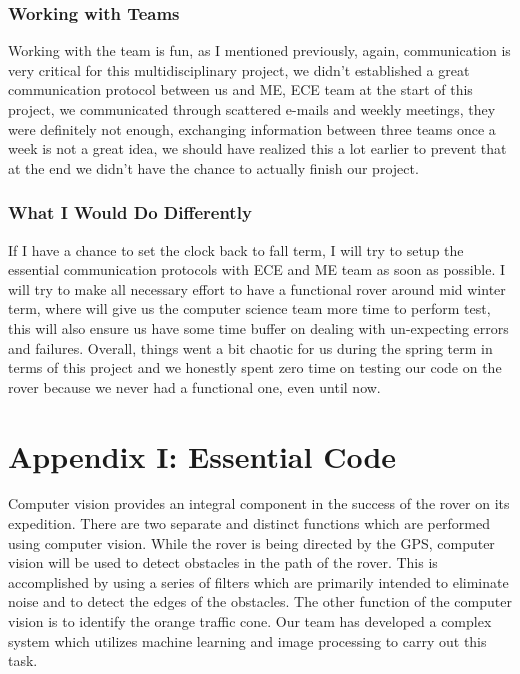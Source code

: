 \documentclass[10pt,letterpaper,onecolumn,draftclsnofoot,journal]{IEEEtran}
\begin{document}
\subsubsection{\textbf{Working with Teams}}
Working with the team is fun, as I mentioned previously, again, communication is very critical for this multidisciplinary project, we didn't established a great communication protocol between us and ME, ECE team at the start of this project, we communicated through scattered e-mails and weekly meetings, they were definitely not enough, exchanging information between three teams once a week is not a great idea, we should have realized this a lot earlier to prevent that at the end we didn't have the chance to actually finish our project.  
\vspace{.3cm}

\subsubsection{\textbf{What I Would Do Differently}}
If I have a chance to set the clock back to fall term, I will try to setup the essential communication protocols with ECE and ME team as soon as possible. I will try to make all necessary effort to have a functional rover around mid winter term, where will give us the computer science team more time to perform test, this will also ensure us have some time buffer on dealing with un-expecting errors and failures. Overall, things went a bit chaotic for us during the spring term in terms of this project and we honestly spent zero time on testing our code on the rover because we never had a functional one, even until now.   
\vspace{.3cm}


\section{\textbf{Appendix I: Essential Code}}
Computer vision provides an integral component in the success of the rover on its expedition. There are two separate and distinct functions which are performed using computer vision. While the rover is being directed by the GPS, computer vision will be used to detect obstacles in the path of the rover. This is accomplished by using a series of filters which are primarily intended to eliminate noise and to detect the edges of the obstacles. The other function of the computer vision is to identify the orange traffic cone. Our team has developed a complex system which utilizes machine learning and image processing to carry out this task.\vspace{.3cm}
\par
\end{document}
